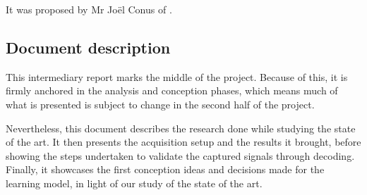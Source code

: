 It was proposed by Mr Joël Conus of \TBindustryName.

\subsection{Document description}
This intermediary report marks the middle of the project. Because of this, it is firmly anchored in the analysis and conception phases, which means much of what is presented is subject to change in the second half of the project.

Nevertheless, this document describes the research done while studying the state of the art. It then presents the acquisition setup and the results it brought, before showing the steps undertaken to validate the captured signals through decoding. Finally, it showcases the first conception ideas and decisions made for the learning model, in light of our study of the state of the art.
